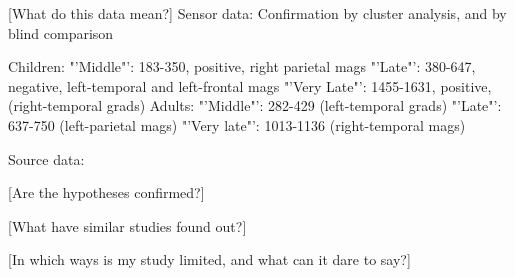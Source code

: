 
[What do this data mean?]
Sensor data:
Confirmation by cluster analysis, and by blind comparison

Children:
"'Middle"': 183-350, positive, right parietal mags
"'Late"': 380-647, negative, left-temporal and left-frontal mags
"'Very Late"': 1455-1631, positive, (right-temporal grads)
Adults:
"'Middle"': 282-429 (left-temporal grads)
"'Late"': 637-750 (left-parietal mags)
"'Very late"': 1013-1136 (right-temporal mags)

Source data:


[Are the hypotheses confirmed?]

[What have similar studies found out?]

[In which ways is my study limited, and what can it dare to say?]